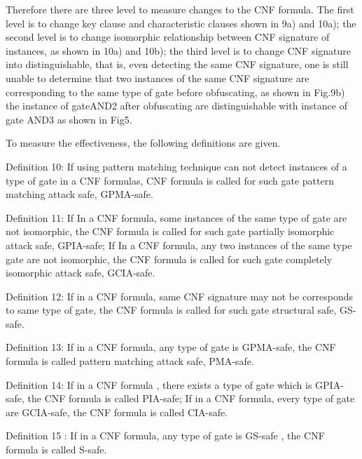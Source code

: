 \documentclass[runningheads,a4paper]{llncs}
\begin{document}
Therefore there are three level to measure changes to the CNF formula. The first level is to change key clause and characteristic clauses shown in 9a) and 10a); the second level is to change isomorphic relationship between CNF signature of instances, as shown in 10a) and 10b); the third level is to change CNF signature into distinguishable, that is, even detecting the same CNF signature, one is still unable to determine that two instances of the same CNF signature are corresponding to the same type of gate before obfuscating, as shown in Fig.9b) the instance of gateAND2 after obfuscating are distinguishable with instance of gate AND3 as shown in Fig5.

To measure the effectiveness, the following definitions are given.

\noindent \newline Definition 10: If using pattern matching technique can not detect instances of a type of gate in a CNF formulas, CNF formula is called for such gate pattern matching attack safe, GPMA-safe.

\noindent \newline Definition 11: If In a CNF formula, some instances of the same type of gate are not isomorphic, the CNF formula is called for such gate partially isomorphic attack safe, GPIA-safe; If In a CNF formula, any two instances of the same type gate are not isomorphic, the CNF formula is called for such gate completely isomorphic attack safe, GCIA-safe.

\noindent \newline Definition 12: If in a CNF formula, same CNF signature may not be corresponds to same type of gate, the CNF formula is called for such gate structural safe, GS-safe.

\noindent \newline Definition 13: If in a CNF formula, any type of gate is GPMA-safe, the CNF formula is called pattern matching attack safe, PMA-safe.

\noindent \newline Definition 14: If in a CNF formula , there exists a type of gate which is GPIA-safe, the CNF formula is called PIA-safe; If in a CNF formula, every type of gate are GCIA-safe, the CNF formula is called CIA-safe.

\noindent \newline Definition 15 : If in a CNF formula, any type of gate is GS-safe , the CNF formula is called S-safe. \noindent \newline {}  
\end{document}

